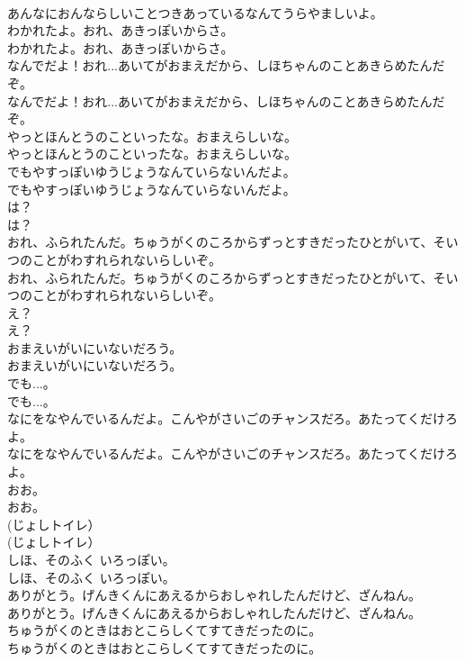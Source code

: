 \documentclass[8pt]{extreport}
\begin{document}
\begin{CJK}{UTF8}{min}
\\	あんなにおんならしいことつきあっているなんてうらやましいよ。 
\\	わかれたよ。おれ、あきっぽいからさ。	
\\	わかれたよ。おれ、あきっぽいからさ。 
\\	なんでだよ！おれ...あいてがおまえだから、しほちゃんのことあきらめたんだぞ。	
\\	なんでだよ！おれ...あいてがおまえだから、しほちゃんのことあきらめたんだぞ。 
\\	やっとほんとうのこといったな。おまえらしいな。	
\\	やっとほんとうのこといったな。おまえらしいな。 
\\	でもやすっぽいゆうじょうなんていらないんだよ。	
\\	でもやすっぽいゆうじょうなんていらないんだよ。 
\\	は？	
\\	は？ 
\\	おれ、ふられたんだ。ちゅうがくのころからずっとすきだったひとがいて、そいつのことがわすれられないらしいぞ。	
\\	おれ、ふられたんだ。ちゅうがくのころからずっとすきだったひとがいて、そいつのことがわすれられないらしいぞ。 
\\	え？	
\\	え？ 
\\	おまえいがいにいないだろう。	
\\	おまえいがいにいないだろう。 
\\	でも...。	
\\	でも...。 
\\	なにをなやんでいるんだよ。こんやがさいごのチャンスだろ。あたってくだけろよ。	
\\	なにをなやんでいるんだよ。こんやがさいごのチャンスだろ。あたってくだけろよ。 
\\	おお。	
\\	おお。 
\\	(じょしトイレ）	
\\	(じょしトイレ） 
\\	しほ、そのふく いろっぽい。	
\\	しほ、そのふく いろっぽい。 
\\	ありがとう。げんきくんにあえるからおしゃれしたんだけど、ざんねん。	
\\	ありがとう。げんきくんにあえるからおしゃれしたんだけど、ざんねん。 
\\	ちゅうがくのときはおとこらしくてすてきだったのに。	
\\	ちゅうがくのときはおとこらしくてすてきだったのに。 

\end{CJK}
\end{document}
